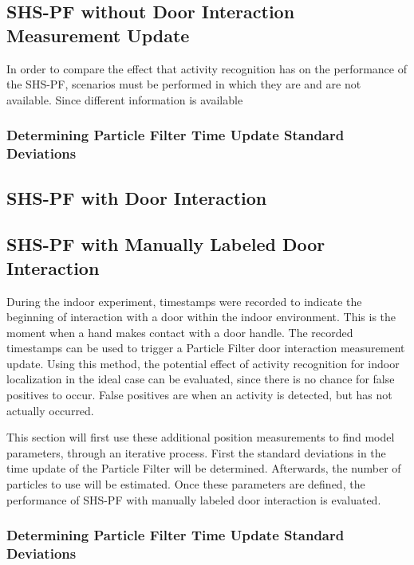 \subsection{SHS-PF without Door Interaction Measurement Update}

In order to compare the effect that activity recognition has on the performance of the SHS-PF, scenarios must be performed in which they are and are not available. Since different information is available 

\subsubsection{Determining Particle Filter Time Update Standard Deviations}

\subsection{SHS-PF with Door Interaction}

\subsection{SHS-PF with Manually Labeled Door Interaction}
\label{sec:results-SHS_PF_manually indicated}
During the indoor experiment, timestamps were recorded to indicate the beginning of interaction with a door within the indoor environment. This is the moment when a hand makes contact with a door handle. The recorded timestamps can be used to trigger a Particle Filter door interaction measurement update. Using this method, the potential effect of activity recognition for indoor localization in the ideal case can be evaluated, since there is no chance for false positives to occur. False positives are when an activity is detected, but has not actually occurred. \par

This section will first use these additional position measurements to find model parameters, through an iterative process. First the standard deviations in the time update of the Particle Filter will be determined. Afterwards, the number of particles to use will be estimated.  Once these parameters are defined, the performance of SHS-PF with manually labeled door interaction is evaluated.

\subsubsection{Determining Particle Filter Time Update Standard Deviations}

